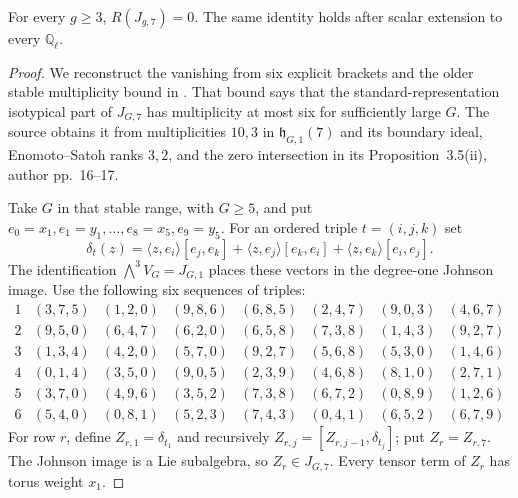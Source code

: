 \begin{proposition}\label{prop:johnson-seven-detector}
For every $g\geq3$, $R(J_{g,7})=0$. The same identity holds
after scalar extension to every $\mathbb Q_\ell$.
\end{proposition}
\begin{proof}
We reconstruct the vanishing from six explicit brackets and the
older stable multiplicity bound in
\cite[proof of Theorem~7.5(iv), author pp.~29--30]{MSS2015}.
That bound says that the standard-representation isotypical
part of $J_{G,7}$ has multiplicity at most six for sufficiently
large $G$. The source obtains it from multiplicities $10,3$
in $\mathfrak h_{G,1}(7)$ and its boundary ideal, Enomoto--Satoh
ranks $3,2$, and the zero intersection in its
Proposition~3.5(ii), author pp.~16--17.

Take $G$ in that stable range, with $G\geq5$, and put
$e_0=x_1,e_1=y_1,\ldots,e_8=x_5,e_9=y_5$.
For an ordered triple $t=(i,j,k)$ set
\[
 \delta_t(z)=\langle z,e_i\rangle[e_j,e_k]
       +\langle z,e_j\rangle[e_k,e_i]
       +\langle z,e_k\rangle[e_i,e_j].
\]
The identification $\bigwedge^3V_G=J_{G,1}$ places these
vectors in the degree-one Johnson image. Use the following
six sequences of triples:
\[
\begin{array}{c|lllllll}
1&(3,7,5)&(1,2,0)&(9,8,6)&(6,8,5)&(2,4,7)&(9,0,3)&(4,6,7)\\
2&(9,5,0)&(6,4,7)&(6,2,0)&(6,5,8)&(7,3,8)&(1,4,3)&(9,2,7)\\
3&(1,3,4)&(4,2,0)&(5,7,0)&(9,2,7)&(5,6,8)&(5,3,0)&(1,4,6)\\
4&(0,1,4)&(3,5,0)&(9,0,5)&(2,3,9)&(4,6,8)&(8,1,0)&(2,7,1)\\
5&(3,7,0)&(4,9,6)&(3,5,2)&(7,3,8)&(6,7,2)&(0,8,9)&(1,2,6)\\
6&(5,4,0)&(0,8,1)&(5,2,3)&(7,4,3)&(0,4,1)&(6,5,2)&(6,7,9)
\end{array}
\]
For row $r$, define $Z_{r,1}=\delta_{t_1}$ and recursively
$Z_{r,j}=[Z_{r,j-1},\delta_{t_j}]$; put $Z_r=Z_{r,7}$.
The Johnson image is a Lie subalgebra, so $Z_r\in J_{G,7}$.
Every tensor term of $Z_r$ has torus weight $x_1$.


\end{proof}
